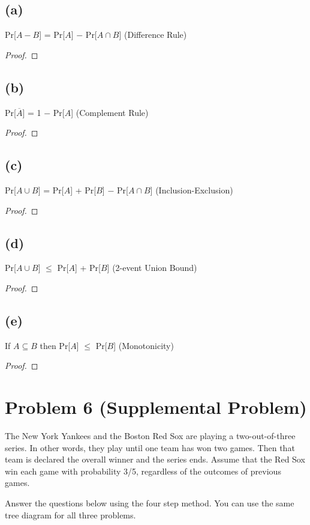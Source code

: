 \documentclass[14pt]{extarticle}
\begin{document}
\subsection{(a)}
Pr[$A - B$] = Pr[$A$] $-$ Pr[$A \cap B$] (Difference Rule)
\begin{proof}
\end{proof}

\subsection{(b)}
Pr[$\overline{A}$] = 1 $-$ Pr[$A$] (Complement Rule)
\begin{proof}
\end{proof}

\subsection{(c)}
Pr[$A \cup B$] = Pr[$A$] + Pr[$B$] $-$ Pr[$A \cap B$] (Inclusion-Exclusion)
\begin{proof}
\end{proof}

\subsection{(d)}
Pr[$A \cup B$] $\leq$ Pr[$A$] + Pr[$B$] (2-event Union Bound)
\begin{proof}
\end{proof}

\subsection{(e)}
If $A \subseteq B$ then Pr[$A$] $\leq$ Pr[$B$] (Monotonicity)
\begin{proof}
\end{proof}

\section{Problem 6 (Supplemental Problem)}
The New York Yankees and the Boston Red Sox are playing a two-out-of-three series. In other words, they play until one team has won two games. Then that team is declared the overall winner and the series ends. Assume that the Red Sox win each game with probability 3/5, regardless of the outcomes of previous games.

Answer the questions below using the four step method. You can use the same tree diagram for all three problems.
\end{document}
